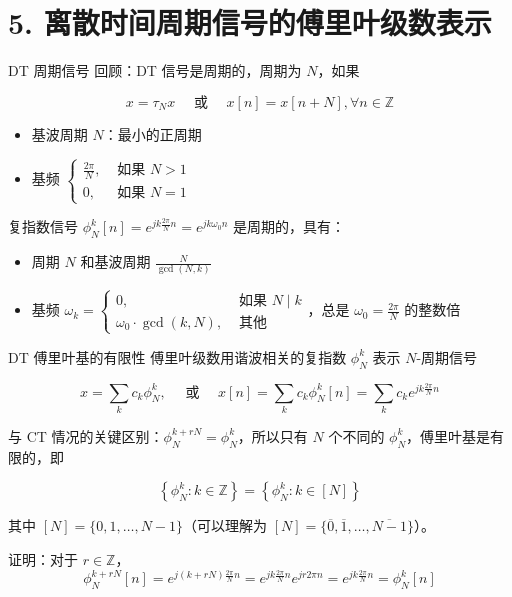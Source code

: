 \documentclass[
  ignorenonframetext,
]{beamer}
\providecommand{\tightlist}{%
  \setlength{\itemsep}{0pt}\setlength{\parskip}{0pt}}
\begin{document}
\section{5. 离散时间周期信号的傅里叶级数表示}\label{sec35}

\begin{frame}{DT 周期信号}
\protect{}\label{dt-ux5468ux671fux4fe1ux53f7}
回顾：DT 信号是周期的，周期为 \(N\)，如果

\[
x=\tau_{N} x \quad \text { 或 } \quad x[n]=x[n+N], \forall n \in \mathbb{Z}
\]

\begin{itemize}
\tightlist
\item
  基波周期 \(N\)：最小的正周期
\item
  基频
  \(\begin{cases}\frac{2 \pi}{N}, & \text { 如果 } N>1 \\ 0, & \text { 如果 } N=1\end{cases}\)
\end{itemize}

复指数信号
\(\phi_{N}^{k}[n]=e^{j k \frac{2 \pi}{N} n}=e^{j k \omega_{0} n}\)
是周期的，具有：

\begin{itemize}
\tightlist
\item
  周期 \(N\) 和基波周期 \(\frac{N}{\operatorname{gcd}(N, k)}\)
\item
  基频
  \(\omega_{k}= \begin{cases}0, & \text { 如果 } N \mid k \\ \omega_{0} \cdot \operatorname{gcd}(k, N), & \text { 其他 }\end{cases}\)，总是
  \(\omega_{0}=\frac{2 \pi}{N}\) 的整数倍
\end{itemize}
\end{frame}

\begin{frame}{DT 傅里叶基的有限性}
\protect{}\label{dt-ux5085ux91ccux53f6ux57faux7684ux6709ux9650ux6027}
傅里叶级数用谐波相关的复指数 \(\phi_{N}^{k}\) 表示 \(N\)-周期信号

\[
x=\sum_{k} c_{k} \phi_{N}^{k}, \quad \text { 或 } \quad x[n]=\sum_{k} c_{k} \phi_{N}^{k}[n]=\sum_{k} c_{k} e^{j k \frac{2 \pi}{N} n}
\]

与 CT 情况的关键区别：\(\phi_{N}^{k+r N}=\phi_{N}^{k}\)，所以只有 \(N\)
个不同的 \(\phi_{N}^{k}\)，傅里叶基是有限的，即

\[
\left\{\phi_{N}^{k}: k \in \mathbb{Z}\right\}=\left\{\phi_{N}^{k}: k \in[N]\right\}
\]

其中 \([N]=\{0,1, \ldots, N-1\}\)（可以理解为
\([N]=\{\overline{0}, \overline{1}, \ldots, \overline{N-1}\}\)）。

证明：对于 \(r \in \mathbb{Z}\)， \[
\phi_{N}^{k+r N}[n]=e^{j(k+r N) \frac{2 \pi}{N} n}=e^{j k \frac{2 \pi}{N} n} e^{j r 2 \pi n}=e^{j k \frac{2 \pi}{N} n}=\phi_{N}^{k}[n]
\]
\end{frame}
\end{document}
